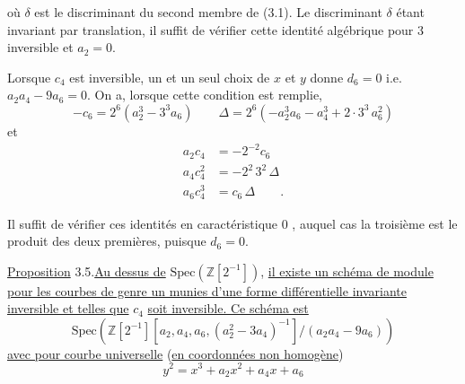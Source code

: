 où $\delta$ est le discriminant du second membre de (3.1). Le discriminant $\delta$ étant invariant par translation, il suffit de vérifier cette identité algébrique pour 3 inversible et $a_2=0$.

Lorsque $c_4$ est inversible, un et un seul choix de $x$ et $y$ donne $d_6=0$  i.e. $a_2a_4-9a_6=0$. On a, lorsque cette condition est remplie,
\[
-c_6=2^6(a_2^3-3^3a_6)\qquad \Delta=2^6(-a_2^3a_6-a_4^3+2\cdot3^3\,a_6^2)\tag*{(3.3)}
\]
et
\[
\begin{aligned}
a_2c_4&=-2^{-2}c_6\\
a_4c_4^2&=-2^2\,3^2\,\Delta\\
a_6c_4^3&=c_6\,\Delta\qquad .
\end{aligned}\tag*{(3.4)}
\]

Il suffit de vérifier ces identités en caractéristique 0 , auquel cas la troisième est le produit des deux premières, puisque $d_6=0$.

\uline{Proposition} 3.5.\qquad \uline{Au dessus de} $\mathrm{Spec}(\mathbb Z[2^{-1}])$, \uline{il existe un schéma de module pour les courbes de genre un munies d'une forme différentielle invariante inversible et telles que} $c_4$ \uline{soit inversible. Ce schéma est}
\[
\mathrm{Spec}(\mathbb Z[2^{-1}][a_2,a_4,a_6,(a_2^2-3a_4)^{-1}]/(a_2a_4-9a_6))
\]
\uline{avec pour courbe universelle} (\uline{en coordonnées non homogène}) 
\[
y^2=x^3+a_2x^2+a_4x+a_6
\]

